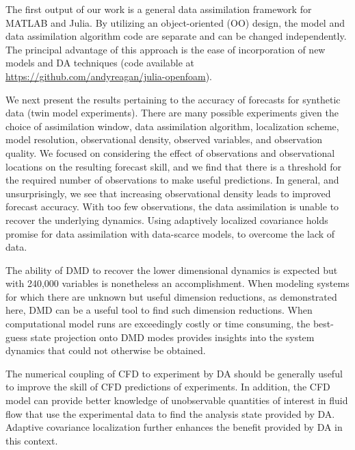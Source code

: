 \documentclass[10pt,letterpaper]{article}
\begin{document}
The first output of our work is a general data assimilation framework for MATLAB and Julia.
By utilizing an object-oriented (OO) design, the model and data assimilation algorithm code are separate and can be changed independently.
The principal advantage of this approach is the ease of incorporation of new models and DA techniques (code available at \url{https://github.com/andyreagan/julia-openfoam}).

We next present the results pertaining to the accuracy of forecasts for synthetic data (twin model experiments).
There are many possible experiments given the choice of assimilation window, data assimilation algorithm, localization scheme, model resolution, observational density, observed variables, and observation quality.
We focused on considering the effect of observations and observational locations on the resulting forecast skill, and we find that there is a threshold for the required number of observations to make useful predictions.
In general, and unsurprisingly, we see that increasing observational density leads to improved forecast accuracy.
With too few observations, the data assimilation is unable to recover the underlying dynamics.
Using adaptively localized covariance holds promise for data assimilation with data-scarce models, to overcome the lack of data.

The ability of DMD to recover the lower dimensional dynamics is expected but with 240,000 variables is nonetheless an accomplishment.
When modeling systems for which there are unknown but useful dimension reductions, as demonstrated here, DMD can be a useful tool to find such dimension reductions.
When computational model runs are exceedingly costly or time consuming, the best-guess state projection onto DMD modes provides insights into the system dynamics that could not otherwise be obtained.

The numerical coupling of CFD to experiment by DA should be generally useful to improve the skill of CFD predictions of experiments.
In addition, the CFD model can provide better knowledge of unobservable quantities of interest in fluid flow that use the experimental data to find the analysis state provided by DA.
Adaptive covariance localization further enhances the benefit provided by DA in this context.
\end{document}
